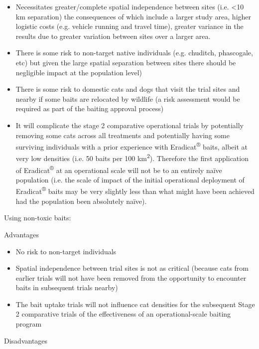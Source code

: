 \documentclass[version=last,
    paper=a4,                               %
    10pt,                                   %
    dvipsnames,
    oneside,                              %
    headings=openany,                       %
    open=any,
    BCOR=7mm,                               %
    DIV=15,     %
]{scrbook}
\begin{document}
\begin{itemize}
\itemsep1pt\parskip0pt
\item
  Necessitates greater/complete spatial independence between sites (i.e.
  \textless{}10 km separation) the consequences of which include a
  larger study area, higher logistic costs (e.g. vehicle running and
  travel time), greater variance in the results due to greater variation
  between sites over a larger area.
\item
  There is some risk to non-target native individuals (e.g. chuditch,
  phascogale, etc) but given the large spatial separation between sites
  there should be negligible impact at the population level)
\item
  There is some risk to domestic cats and dogs that visit the trial
  sites and nearby if some baits are relocated by wildlife (a risk
  assessment would be required as part of the baiting approval process)
\item
  It will complicate the stage 2 comparative operational trials by
  potentially removing some cats across all treatments and potentially
  having some surviving individuals with a prior experience with
  Eradicat\textsuperscript{®} baits, albeit at very low densities (i.e.
  50 baits per 100 km\textsuperscript{2}). Therefore the first
  application of Eradicat\textsuperscript{®} at an operational scale
  will not be to an entirely naïve population (i.e. the scale of impact
  of the initial operational deployment of Eradicat\textsuperscript{®}
  baits may be very slightly less than what might have been achieved had
  the population been absolutely naïve).
\end{itemize}

Using non-toxic baits:

Advantages

\begin{itemize}
\itemsep1pt\parskip0pt
\item
  No risk to non-target individuals
\item
  Spatial independence between trial sites is not as critical (because
  cats from earlier trials will not have been removed from the
  opportunity to encounter baits in subsequent trials nearby)
\item
  The bait uptake trials will not influence cat densities for the
  subsequent Stage 2 comparative trials of the effectiveness of an
  operational-scale baiting program
\end{itemize}

Disadvantages
\end{document}
